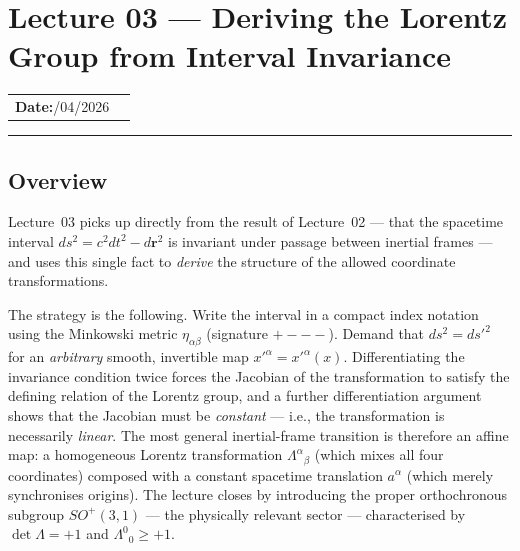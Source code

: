 
\section{Lecture 03 — Deriving the Lorentz Group from Interval Invariance}%
\label{sec:lec03:lorentz_group}

\begin{center}
\begin{tabular}{ll}
  \textbf{Date:}\quad 12/04/2026   & \\
\end{tabular}
\end{center}
\hrule\vspace{1.5em}

\subsection*{Overview}

Lecture~03 picks up directly from the result of Lecture~02 — that
the spacetime interval $ds^2 = c^2 dt^2 - d\mathbf{r}^2$ is invariant
under passage between inertial frames — and uses this single fact to
\emph{derive} the structure of the allowed coordinate transformations.

The strategy is the following. Write the interval in a compact
index notation using the Minkowski metric $\eta_{\alpha\beta}$
(signature $+{-}{-}{-}$). Demand that $ds^2 = ds'^2$ for an
\emph{arbitrary} smooth, invertible map $x'^\alpha = x'^\alpha(x)$.
Differentiating the invariance condition twice forces the Jacobian of
the transformation to satisfy the defining relation of the Lorentz
group, and a further differentiation argument shows that the Jacobian
must be \emph{constant} — i.e., the transformation is necessarily
\emph{linear}. The most general inertial-frame transition is therefore
an affine map: a homogeneous Lorentz transformation $\Lambda^\alpha{}_\beta$
(which mixes all four coordinates) composed with a constant spacetime
translation $a^\alpha$ (which merely synchronises origins). The
lecture closes by introducing the proper orthochronous subgroup
$SO^+(3,1)$ — the physically relevant sector — characterised by
$\det\Lambda = +1$ and $\Lambda^0{}_0 \ge +1$.

